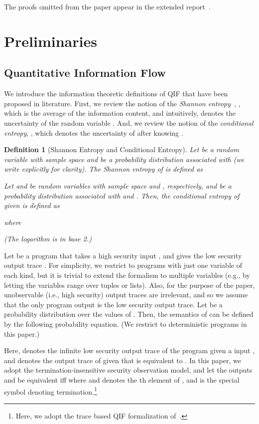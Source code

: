 \documentclass[]{eptcs}
\newtheorem{definition}[theorem]{Definition}
\newcommand{\addappendix}[2]{#2}
\begin{document}
\addappendix{The proofs omitted from the main body of the paper appear
  in the Appendix.}{The proofs omitted from the paper appear in the
  extended report~\cite{longversion}.}

\section{Preliminaries}

\subsection{Quantitative Information Flow}

We introduce the information theoretic definitions of QIF that have
been proposed in literature.  First, we review the notion of the {\em
  Shannon entropy}~\cite{shannon48}, , which is
the average of the information content, and intuitively, denotes the
uncertainty of the random variable .  And, we review the notion of
the {\em conditional entropy}, , which denotes
the uncertainty of  after knowing .
\begin{definition}[Shannon Entropy and Conditional Entropy]
  Let  be a random variable with sample space  and 
  be a probability distribution associated with  (we write 
  explicitly for clarity).  The Shannon entropy of  is defined as


Let  and  be random variables with sample space  and ,
respectively, and  be a probability distribution associated with
 and .  Then, the conditional entropy of  given  is
defined as

where

(The logarithm is in base 2.)
\end{definition}


Let  be a program that takes a high security input , and gives
the low security output trace .  For simplicity, we restrict to
programs with just one variable of each kind, but it is trivial to
extend the formalism to multiple variables (e.g., by letting the
variables range over tuples or lists).  Also, for the purpose of the
paper, unobservable (i.e., high security) output traces are
irrelevant, and so we assume that the only program output is the low
security output trace.  Let  be a probability distribution over
the values of .  Then, the semantics of  can be defined by the
following probability equation.  (We restrict to deterministic
programs in this paper.)

Here,  denotes the infinite low security output trace of the
program  given a input , and  denotes the output trace
of  given  that is equivalent to .  In this paper, we adopt
the termination-insensitive security observation model, and let the
outputs  and  be equivalent iff  where  and  denotes the th
element of , and  is the special symbol denoting
termination.\footnote{Here, we adopt the trace based QIF formalization
  of~\cite{malacaria08}.}
\end{document}
